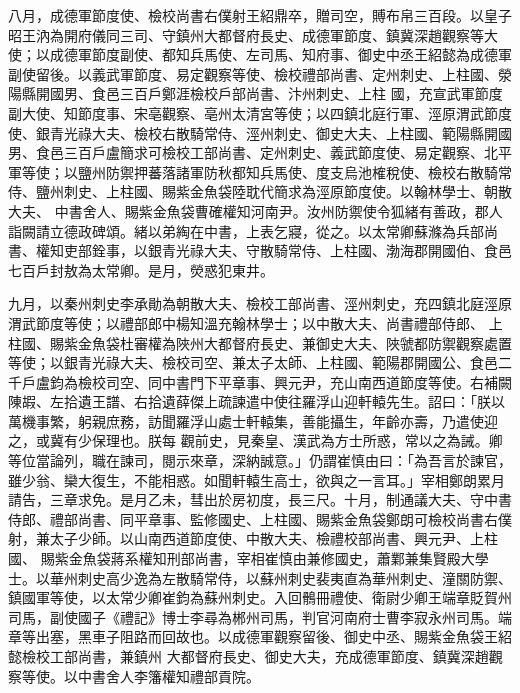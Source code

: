 \begin{pinyinscope}
 八月，成德軍節度使、檢校尚書右僕射王紹鼎卒，贈司空，賻布帛三百段。以皇子昭王汭為開府儀同三司、守鎮州大都督府長史、成德軍節度、鎮冀深趙觀察等大使；以成德軍節度副使、都知兵馬使、左司馬、知府事、御史中丞王紹懿為成德軍副使留後。以義武軍節度、易定觀察等使、檢校禮部尚書、定州刺史、上柱國、滎陽縣開國男、食邑三百戶鄭涯檢校戶部尚書、汴州刺史、上柱
 國，充宣武軍節度副大使、知節度事、宋亳觀察、亳州太清宮等使；以四鎮北庭行軍、涇原渭武節度使、銀青光祿大夫、檢校右散騎常侍、涇州刺史、御史大夫、上柱國、範陽縣開國男、食邑三百戶盧簡求可檢校工部尚書、定州刺史、義武節度使、易定觀察、北平軍等使；以鹽州防禦押蕃落諸軍防秋都知兵馬使、度支烏池榷稅使、檢校右散騎常侍、鹽州刺史、上柱國、賜紫金魚袋陸耽代簡求為涇原節度使。以翰林學士、朝散大夫、
 中書舍人、賜紫金魚袋曹確權知河南尹。汝州防禦使令狐緒有善政，郡人詣闕請立德政碑頌。緒以弟綯在中書，上表乞寢，從之。以太常卿蘇滌為兵部尚書、權知吏部銓事，以銀青光祿大夫、守散騎常侍、上柱國、渤海郡開國伯、食邑七百戶封敖為太常卿。是月，熒惑犯東井。



 九月，以秦州刺史李承勛為朝散大夫、檢校工部尚書、涇州刺史，充四鎮北庭涇原渭武節度等使；以禮部郎中楊知溫充翰林學士；以中散大夫、尚書禮部侍郎、
 上柱國、賜紫金魚袋杜審權為陜州大都督府長史、兼御史大夫、陜虢都防禦觀察處置等使；以銀青光祿大夫、檢校司空、兼太子太師、上柱國、範陽郡開國公、食邑二千戶盧鈞為檢校司空、同中書門下平章事、興元尹，充山南西道節度等使。右補闕陳嘏、左拾遺王譜、右拾遺薛傑上疏諫遣中使往羅浮山迎軒轅先生。詔曰：「朕以萬機事繁，躬親庶務，訪聞羅浮山處士軒轅集，善能攝生，年齡亦壽，乃遣使迎之，或冀有少保理也。朕每
 觀前史，見秦皇、漢武為方士所惑，常以之為誡。卿等位當論列，職在諫司，閱示來章，深納誠意。」仍謂崔慎由曰：「為吾言於諫官，雖少翁、欒大復生，不能相惑。如聞軒轅生高士，欲與之一言耳。」宰相鄭朗累月請告，三章求免。是月乙未，彗出於房初度，長三尺。十月，制通議大夫、守中書侍郎、禮部尚書、同平章事、監修國史、上柱國、賜紫金魚袋鄭朗可檢校尚書右僕射，兼太子少師。以山南西道節度使、中散大夫、檢禮校部尚書、興元尹、上柱國、
 賜紫金魚袋蔣系權知刑部尚書，宰相崔慎由兼修國史，蕭鄴兼集賢殿大學士。以華州刺史高少逸為左散騎常侍，以蘇州刺史裴夷直為華州刺史、潼關防禦、鎮國軍等使，以太常少卿崔鈞為蘇州刺史。入回鶻冊禮使、衛尉少卿王端章貶賀州司馬，副使國子《禮記》博士李尋為郴州司馬，判官河南府士曹李寂永州司馬。端章等出塞，黑車子阻路而回故也。以成德軍觀察留後、御史中丞、賜紫金魚袋王紹懿檢校工部尚書，兼鎮州
 大都督府長史、御史大夫，充成德軍節度、鎮冀深趙觀察等使。以中書舍人李籓權知禮部貢院。




\end{pinyinscope}
